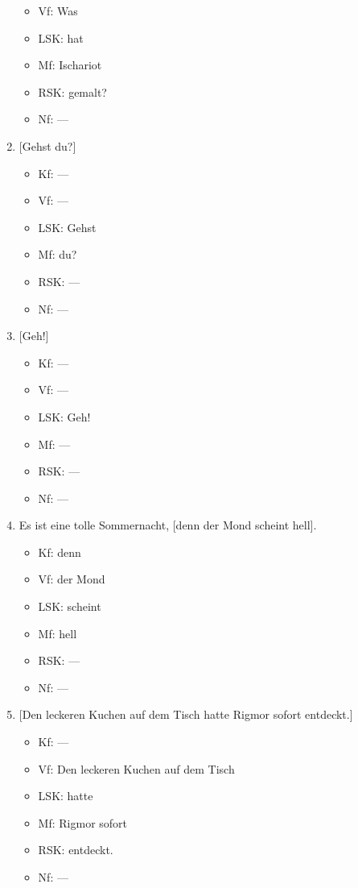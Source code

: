 \begin{enumerate}
\begin{itemize}
      \item Vf: Was
      \item LSK: hat
      \item Mf: Ischariot
      \item RSK: gemalt?
      \item Nf: ---
    \end{itemize}
  \item{} [Gehst du?]
    \begin{itemize}
      \item Kf: ---
      \item Vf: ---
      \item LSK: Gehst
      \item Mf: du?
      \item RSK: ---
      \item Nf: ---
    \end{itemize}
  \item{} [Geh!]
    \begin{itemize}
      \item Kf: ---
      \item Vf: ---
      \item LSK: Geh!
      \item Mf: ---
      \item RSK: ---
      \item Nf: ---
    \end{itemize}
  \item Es ist eine tolle Sommernacht, [denn der Mond scheint hell].
    \begin{itemize}
      \item Kf: denn
      \item Vf: der Mond
      \item LSK: scheint
      \item Mf: hell
      \item RSK: ---
      \item Nf: ---
    \end{itemize}
  \item{} [Den leckeren Kuchen auf dem Tisch hatte Rigmor sofort entdeckt.]
    \begin{itemize}
      \item Kf: ---
      \item Vf: Den leckeren Kuchen auf dem Tisch
      \item LSK: hatte
      \item Mf: Rigmor sofort
      \item RSK: entdeckt.
      \item Nf: ---

\end{itemize}
\end{enumerate}
